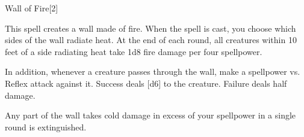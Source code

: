 \begin{spellsection}{Wall of Fire}[2]
    \begin{spellheader}
    \end{spellheader}
    \begin{spellcontent}
        \begin{spelltargetinginfo}
        \end{spelltargetinginfo}
        \begin{spelleffects}
            \spelleffect This spell creates a wall made of fire.
            When the spell is cast, you choose which sides of the wall radiate heat.
            At the end of each round, all creatures within 10 feet of a side radiating heat take 1d8 fire damage per four spellpower.

            In addition, whenever a creature passes through the wall, make a spellpower vs. Reflex attack against it.
            Success deals [d6] to the creature.
            Failure deals half damage.
            \spelldur \durshort
        \end{spelleffects}
    \end{spellcontent}
    \begin{spellfooter}
        \spellnotes Any part of the wall takes cold damage in excess of your spellpower in a single round is extinguished.
        \miscastexplode
    \end{spellfooter}
    \begin{spellaugments}
    \end{spellaugments}
\end{spellsection}


